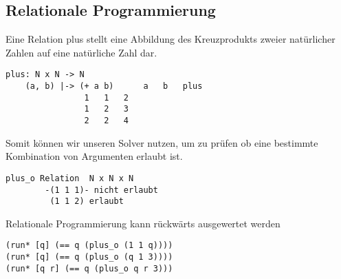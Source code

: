 \subsection{Relationale Programmierung}

Eine Relation plus stellt eine Abbildung des Kreuzprodukts zweier natürlicher Zahlen auf eine natürliche Zahl dar.

\begin{lstlisting}
plus: N x N -> N
    (a, b) |-> (+ a b)		a   b   plus
				1   1   2
				1   2   3
				2   2   4
\end{lstlisting}

Somit können wir unseren Solver nutzen, um zu prüfen ob eine bestimmte Kombination von Argumenten erlaubt ist.
\begin{lstlisting}
plus_o Relation	 N x N x N
		-(1 1 1)- nicht erlaubt
		 (1 1 2) erlaubt
\end{lstlisting}

Relationale Programmierung kann rückwärts ausgewertet werden

\begin{lstlisting}
(run* [q] (== q (plus_o (1 1 q))))
(run* [q] (== q (plus_o (q 1 3))))
(run* [q r] (== q (plus_o q r 3)))
\end{lstlisting}

